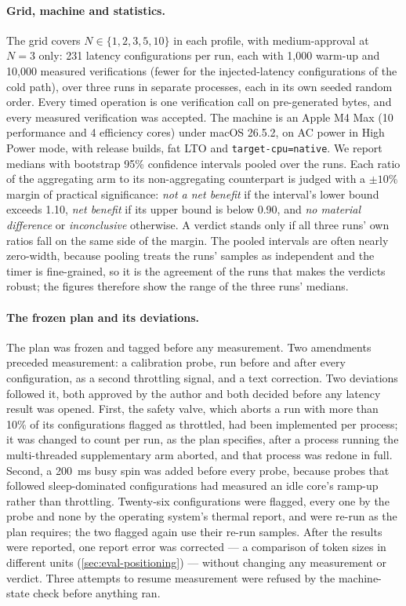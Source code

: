 \documentclass[11pt,a4paper]{article}
\begin{document}
\paragraph{Grid, machine and statistics.}
The grid covers $N \in \{1, 2, 3, 5, 10\}$ in each profile, with
medium-approval at $N = 3$ only: 231 latency configurations per run,
each with 1,000 warm-up and 10,000 measured verifications (fewer for the
injected-latency configurations of the cold path), over three
runs in separate processes, each in its own seeded random order. Every
timed operation is one verification call on pre-generated bytes, and
every measured verification was accepted. The machine is an Apple M4
Max (10 performance and 4 efficiency cores) under macOS 26.5.2, on AC
power in High Power mode, with release builds, fat LTO and
\texttt{target-cpu=native}. We report medians with bootstrap 95\%
confidence intervals pooled over the runs. Each ratio of the aggregating
arm to its non-aggregating counterpart is judged with a $\pm 10\%$
margin of practical significance: \emph{not a net benefit} if the
interval's lower bound exceeds 1.10, \emph{net benefit} if its upper
bound is below 0.90, and \emph{no material difference} or
\emph{inconclusive} otherwise. A verdict stands only if all three runs'
own ratios fall on the same side of the margin. The pooled intervals are
often nearly zero-width, because pooling treats the runs' samples as
independent and the timer is fine-grained, so it is the agreement of
the runs that makes the verdicts robust; the figures therefore show the
range of the three runs' medians.

\paragraph{The frozen plan and its deviations.}
The plan was frozen and tagged before any measurement. Two amendments
preceded measurement: a calibration probe, run before and after every
configuration, as a second throttling signal, and a text correction.
Two deviations followed it, both approved by the author and both
decided before any latency result was opened. First, the safety valve, which aborts a run
with more than 10\% of its configurations flagged as throttled, had
been implemented per process; it was changed to count per run, as the
plan specifies, after a process running the multi-threaded supplementary
arm aborted, and that process was redone in full. Second, a 200~ms busy
spin was added before every probe, because probes that followed
sleep-dominated configurations had measured an idle core's ramp-up
rather than throttling. Twenty-six configurations were flagged, every one
by the probe and none by the operating system's thermal report, and were
re-run as the plan requires; the two flagged again use their re-run
samples. After the results were reported, one report error was
corrected --- a comparison of token sizes in different units
(\cref{sec:eval-positioning}) --- without changing any measurement or verdict. Three attempts to
resume measurement were refused by the machine-state check before
anything ran.
\end{document}
